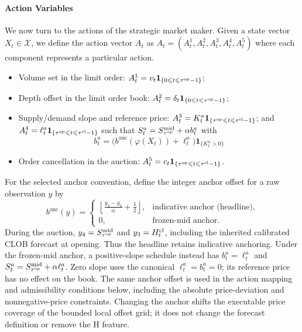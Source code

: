 \documentclass[11pt]{article}
\begin{document}
\paragraph{Action Variables} We now turn to the actions of the strategic market maker. Given a state vector $X_t\in \mathcal X$, we define the action vector $A_t$ as $A_t = (A_t^1, A_t^2, A_t^3, A_t^4, A_t^5)$ where each component represents a particular action.
\begin{itemize}
    \item Volume set in the limit order: $A_t^1 = v_t \mathbf{1}_{\{0 \leqslant t \leqslant {\tau^{\mathrm{op}}}-1\}}$;
    \item Depth offset in the limit order book: $A_t^2 =\delta_t\mathbf{1}_{\{0 \leqslant t \leqslant {\tau^{\mathrm{op}}}-1\}}$;
    \item Supply/demand slope and reference price: $A_t^3 =K_t^a\mathbf{1}_{\{\tau^{\mathrm{op}} \leqslant t \leqslant \tau^{\mathrm{cl}}-1\}}$;
   and $A_t^4 = \ell_t^a\mathbf{1}_{\{\tau^{\mathrm{op}} \leqslant t \leqslant \tau^{\mathrm{cl}}-1\}}$ such that $S_t^a = S_{\tau^{\mathrm{op}}}^\mathrm{mid}+\alpha b_t^a$ with \[{b_t^a=\bigl(b^{\mathrm{anc}}(\varphi(X_t))+\ell_t^a\bigr)\mathbf1_{\{K_t^a>0\}}}\]
    \item Order cancellation in the auction: $A_t^5 =c_t\mathbf{1}_{\{\tau^{\mathrm{op}} \leqslant t \leqslant \tau^{\mathrm{cl}}-1\}}$.
\end{itemize}
\begingroup
For the selected anchor convention, define the integer anchor offset for a raw observation $y$ by
\[
b^{\mathrm{anc}}(y)=\begin{cases}
\displaystyle\left\lfloor\frac{y_3-y_4}{\alpha}+\frac12\right\rfloor,
&\text{indicative anchor (headline)},\\[0.5em]
0,&\text{frozen-mid anchor}.
\end{cases}
\]
During the auction, $y_4=S_{\tau^{\mathrm{op}}}^{\mathrm{mid}}$ and $y_3=H_t^{\mathrm{cl}}$, including the inherited calibrated CLOB forecast at opening. Thus the headline retains indicative anchoring. Under the frozen-mid anchor, a positive-slope schedule instead has $b_t^a=\ell_t^a$ and $S_t^a=S_{\tau^{\mathrm{op}}}^{\mathrm{mid}}+\alpha\ell_t^a$. Zero slope uses the canonical $\ell_t^a=b_t^a=0$; its reference price has no effect on the book. The same anchor offset is used in the action mapping and admissibility conditions below, including the absolute price-deviation and nonnegative-price constraints. Changing the anchor shifts the executable price coverage of the bounded local offset grid; it does not change the forecast definition or remove the H feature.
\end{document}
